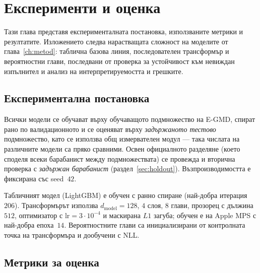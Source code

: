 \chapter{Експерименти и оценка}
\label{ch:eksperimenti}

Тази глава представя експерименталната постановка, използваните метрики и
резултатите. Изложението следва нарастващата сложност на моделите от
глава~\ref{ch:metod}: таблична базова линия, последователен трансформър и
вероятностни глави, последвани от проверка за устойчивост към невиждан изпълнител
и анализ на интерпретируемостта и грешките.

\section{Експериментална постановка}
\label{sec:postanovka}

Всички модели се обучават върху обучаващото подмножество на E-GMD, спират рано по
валидационното и се оценяват върху \emph{задържаното тестово} подмножество, като
се използва общ измервателен модул — така числата на различните модели са пряко
сравними. Освен официалното разделяне (което споделя всеки барабанист между
подмножествата) се провежда и вторична проверка с \emph{задържан барабанист}
(раздел~\ref{sec:holdout}). Възпроизводимостта е фиксирана със seed~$42$.

Табличният модел (LightGBM) е обучен с ранно спиране (най-добра итерация~$206$).
Трансформърът използва $d_{\text{model}}=128$, $4$ слоя, $8$ глави, прозорец с
дължина $512$, оптимизатор  с $\text{lr}=3\cdot10^{-4}$ и маскирана
$L1$ загуба; обучен е на Apple MPS с най-добра епоха~$14$. Вероятностните глави са
инициализирани от контролната точка на трансформъра и дообучени с NLL.

\section{Метрики за оценка}
\label{sec:metriki}

